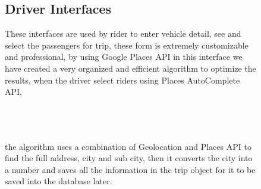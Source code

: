 \begin{figure}
\hspace*{\fill}
\hfill 
{}
\hspace*{\fill}
\end{figure}

\begin{figure}
\subsection{Driver Interfaces}
These interfaces are used by rider to enter vehicle detail, see and select the passengers for trip, these form is extremely customizable and professional, by using Google Places API in this interface we have created a very organized and efficient algorithm to optimize the results, when the driver select riders using Places AutoComplete API,\\~\\

\hspace*{\fill}
\hfill 
{}\\~\\
\hspace*{\fill}

the algorithm uses a combination of Geolocation and Places API to find the full address, city and sub city, then it converts the city into a number and saves all the information in the trip object for it to be saved into the database later.
\end{figure}

\begin{figure}
\hspace*{\fill}
\hfill 
{}
\hspace*{\fill}\\
\hspace*{\fill}
\hfill 
{}
\hspace*{\fill}
\end{figure}

\begin{figure}
\centering
{}
\end{figure}